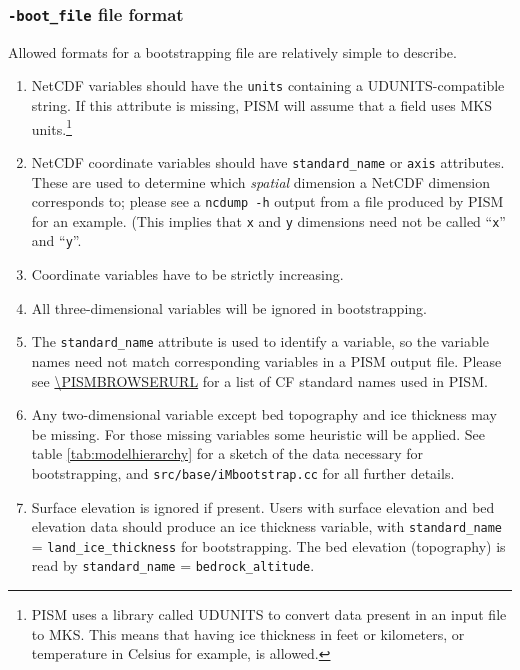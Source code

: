 \documentclass[titlepage,letterpaper,final]{scrartcl}
\begin{document}
\subsubsection*{\texttt{-boot_file} file format}
\label{sec:bootstrapping-format}  Allowed formats for a bootstrapping file are relatively simple to describe. 
\begin{enumerate}
\item NetCDF variables should have the \texttt{units} containing a
  UDUNITS-compatible string. If this attribute is missing, PISM will assume
  that a field uses MKS units.\footnote{PISM uses a library called UDUNITS to convert data present in an input file to MKS.   This means that having ice thickness in feet or kilometers, or temperature in Celsius for example, is allowed.}
\item NetCDF coordinate variables should have \texttt{standard_name} or
  \texttt{axis} attributes. These are used to
  determine which \emph{spatial} dimension a NetCDF dimension corresponds to;
  please see a \texttt{ncdump -h} output from a file produced by PISM for an example. (This implies
  that \texttt{x} and \texttt{y} dimensions need not be called ``\texttt{x}''
  and ``\texttt{y}''.
\item Coordinate variables have to be strictly increasing.
\item All three-dimensional variables will be ignored in bootstrapping.
\item The \texttt{standard_name} attribute is used to identify a variable, so
  the variable names need not match corresponding variables in a
  PISM output file. Please see \url{\PISMBROWSERURL} for a list of CF standard
  names used in PISM.
\item Any two-dimensional variable except bed topography and ice thickness may
  be missing. For those missing variables some heuristic will be applied. See
  table \ref{tab:modelhierarchy} for a sketch of the data necessary for
  bootstrapping, and \texttt{src/base/iMbootstrap.cc} for all further details.
\item Surface elevation is ignored if present. Users with surface elevation and
  bed elevation data should produce an ice thickness variable, with
  \texttt{standard_name} = \texttt{land_ice_thickness} for bootstrapping. The
  bed elevation (topography) is read by \texttt{standard_name} =
  \texttt{bedrock_altitude}.
\end{enumerate}
\end{document}
